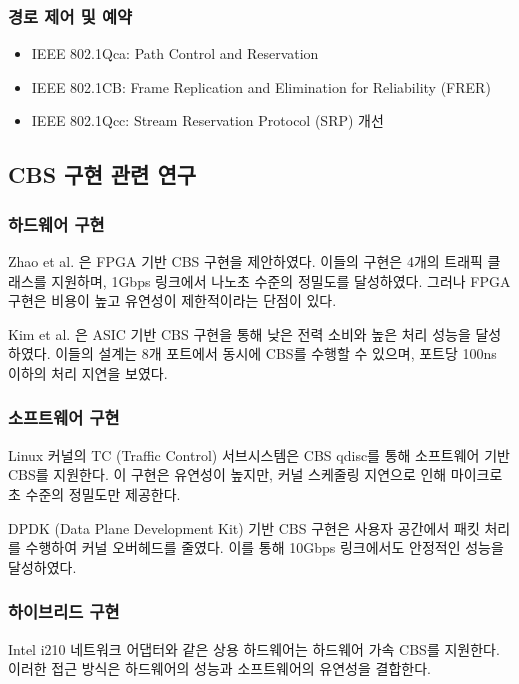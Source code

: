 \documentclass[twocolumn,10pt]{article}
\begin{document}
\subsubsection{경로 제어 및 예약}
\begin{itemize}
    \item IEEE 802.1Qca: Path Control and Reservation
    \item IEEE 802.1CB: Frame Replication and Elimination for Reliability (FRER)
    \item IEEE 802.1Qcc: Stream Reservation Protocol (SRP) 개선
\end{itemize}

\subsection{CBS 구현 관련 연구}

\subsubsection{하드웨어 구현}

Zhao et al. \cite{zhao2020timing}은 FPGA 기반 CBS 구현을 제안하였다. 이들의 구현은 4개의 트래픽 클래스를 지원하며, 1Gbps 링크에서 나노초 수준의 정밀도를 달성하였다. 그러나 FPGA 구현은 비용이 높고 유연성이 제한적이라는 단점이 있다.

Kim et al. \cite{kim2021hardware}은 ASIC 기반 CBS 구현을 통해 낮은 전력 소비와 높은 처리 성능을 달성하였다. 이들의 설계는 8개 포트에서 동시에 CBS를 수행할 수 있으며, 포트당 100ns 이하의 처리 지연을 보였다.

\subsubsection{소프트웨어 구현}

Linux 커널의 TC (Traffic Control) 서브시스템은 CBS qdisc를 통해 소프트웨어 기반 CBS를 지원한다\cite{linux2023cbs}. 이 구현은 유연성이 높지만, 커널 스케줄링 지연으로 인해 마이크로초 수준의 정밀도만 제공한다.

DPDK (Data Plane Development Kit) 기반 CBS 구현\cite{zhang2022dpdk}은 사용자 공간에서 패킷 처리를 수행하여 커널 오버헤드를 줄였다. 이를 통해 10Gbps 링크에서도 안정적인 성능을 달성하였다.

\subsubsection{하이브리드 구현}

Intel i210 네트워크 어댑터와 같은 상용 하드웨어는 하드웨어 가속 CBS를 지원한다\cite{intel2021i210}. 이러한 접근 방식은 하드웨어의 성능과 소프트웨어의 유연성을 결합한다.
\end{document}

